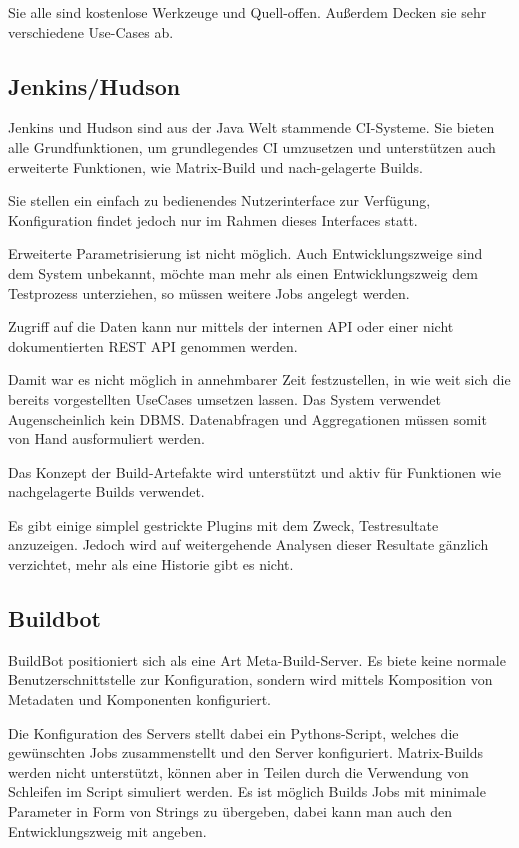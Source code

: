 Sie alle sind kostenlose Werkzeuge und Quell-offen.
Außerdem Decken sie sehr verschiedene Use-Cases ab.

\subsection{Jenkins/Hudson}

Jenkins und Hudson sind aus der Java Welt  stammende CI-Systeme.
Sie bieten alle Grundfunktionen, um grundlegendes CI umzusetzen
und unterst\"utzen auch erweiterte Funktionen,
wie Matrix-Build und nach-gelagerte Builds.

Sie stellen ein einfach zu bedienendes Nutzerinterface zur Verfügung,
Konfiguration findet jedoch nur im Rahmen dieses Interfaces statt.

Erweiterte Parametrisierung ist nicht m\"oglich.
Auch Entwicklungszweige sind dem System unbekannt,
m\"ochte man mehr als einen Entwicklungszweig dem Testprozess unterziehen,
so m\"ussen weitere Jobs angelegt werden.

Zugriff auf die Daten kann nur mittels der internen API oder
einer nicht dokumentierten REST API genommen werden.

Damit war es nicht m\"oglich in annehmbarer Zeit festzustellen,
in wie weit sich die bereits vorgestellten UseCases umsetzen lassen.
Das System verwendet Augenscheinlich kein DBMS.
Datenabfragen und Aggregationen m\"ussen
somit von Hand ausformuliert werden.

Das Konzept der Build-Artefakte wird unterst\"utzt und
aktiv f\"ur Funktionen wie nachgelagerte Builds verwendet.

Es gibt einige simplel gestrickte Plugins mit dem Zweck, Testresultate anzuzeigen.
Jedoch wird auf weitergehende Analysen dieser Resultate g\"anzlich verzichtet,
mehr als eine Historie gibt es nicht.


\subsection{Buildbot}


BuildBot \cite{buildbot:website} positioniert sich als eine Art Meta-Build-Server.
Es biete keine normale Benutzerschnittstelle zur Konfiguration,
sondern wird mittels Komposition von Metadaten und Komponenten konfiguriert.

Die Konfiguration des Servers stellt dabei ein Pythons-Script,
welches die gewünschten Jobs zusammenstellt und den Server konfiguriert.
Matrix-Builds werden nicht unterst\"utzt,
k\"onnen aber in Teilen durch die Verwendung von Schleifen im Script simuliert werden.
Es ist möglich Builds Jobs mit minimale Parameter in Form von Strings zu \"ubergeben,
dabei kann man auch den Entwicklungszweig mit angeben.

